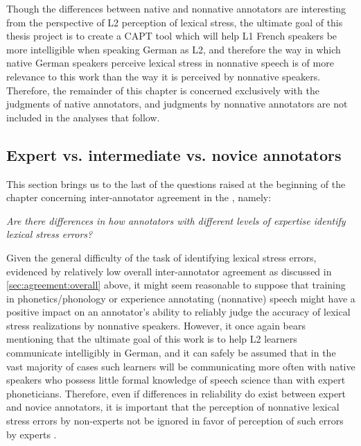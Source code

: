 		Though the differences between native and nonnative annotators are interesting from the perspective of L2 perception of lexical stress, the ultimate goal of this thesis project is to create a CAPT tool which will help L1 French speakers be more intelligible when speaking German as L2, and therefore the way in which native German speakers perceive lexical stress in nonnative speech is of more relevance to this work than the way it is perceived by nonnative speakers. Therefore, the remainder of this chapter is concerned exclusively with the judgments of native annotators, and judgments by nonnative annotators are not included in the analyses that follow.
			
		
		\subsection{Expert vs. intermediate vs. novice annotators}
		\label{sec:agreement:expert}
		
		
		
	This section brings us to the last of the questions raised at the beginning of the chapter concerning inter-annotator agreement in the , namely:
	
	\textit{Are there differences in how 
	annotators with different levels of expertise
	identify lexical stress errors?}
	
	Given the general difficulty of the task of identifying lexical stress errors, evidenced by relatively low overall inter-annotator agreement as discussed in \cref{sec:agreement:overall} above, it might seem reasonable to suppose that training in phonetics/phonology or experience annotating (nonnative) speech might have a positive impact on an annotator's ability to reliably judge the accuracy of lexical stress realizations by nonnative speakers. However, it once again bears mentioning that the ultimate goal of this work is to help L2 learners communicate intelligibly in German, and it can safely be assumed that in the vast majority of cases such learners will be communicating more often with native speakers who possess little formal knowledge of speech science than with expert phoneticians. Therefore, even if differences in reliability do exist between expert and novice annotators, it is important that the perception of nonnative lexical stress errors by non-experts not be ignored in favor of perception of such errors by experts . 
	
